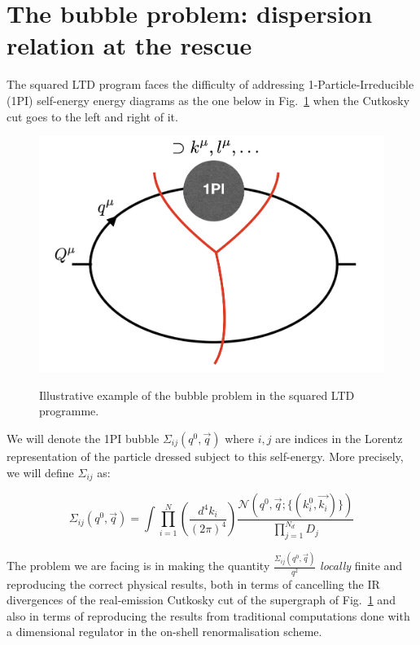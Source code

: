 \documentclass[11pt]{article}
\date{\today}
\begin{document}
%
\phantom{.}\vspace{-0.5cm}
\section{The bubble problem: dispersion relation at the rescue}

The squared LTD program faces the difficulty of addressing 1-Particle-Irreducible (1PI) self-energy energy diagrams as the one below in Fig.~\ref{TheBubbleProblem} when the Cutkosky cut goes to the left and right of it.

\begin{figure}[ht!]
\begin{center}
\begin{minipage}{0.65\linewidth}
\centering
{\caption{\label{TheBubbleProblem} Illustrative example of the bubble problem in the squared LTD programme.}}
{\includegraphics[width=0.65\linewidth]{the_bubble_problem.png}}
\end{minipage}\hfill
\end{center}
\end{figure}

\noindent We will denote the 1PI bubble $\Sigma_{ij}(q^0, \vec{q})$ where $i,j$ are indices in the Lorentz representation of the particle dressed subject to this self-energy. More precisely, we will define $\Sigma_{ij}$ as:

\begin{equation}
\Sigma_{ij}(q^0, \vec{q}) =\int \prod_{i=1}^{N} \left(\frac{d^4 k_i}{(2\pi)^4}\right)  \frac{ \mathcal{N} \left(  q^0, \vec{q} ; \{ (k_i^0, \vec{k_i}) \} \right) } {\prod_{j=1}^{N_d} D_j}
\end{equation}

The problem we are facing is in making the quantity $\frac{\Sigma_{ij}(q^0, \vec{q})}{q^2}$ \emph{locally} finite and reproducing the correct physical results, both in terms of cancelling the IR divergences of the real-emission Cutkosky cut of the supergraph of Fig.~\ref{TheBubbleProblem} and also in terms of reproducing the results from traditional computations done with a dimensional regulator in the on-shell renormalisation scheme.
\end{document}
